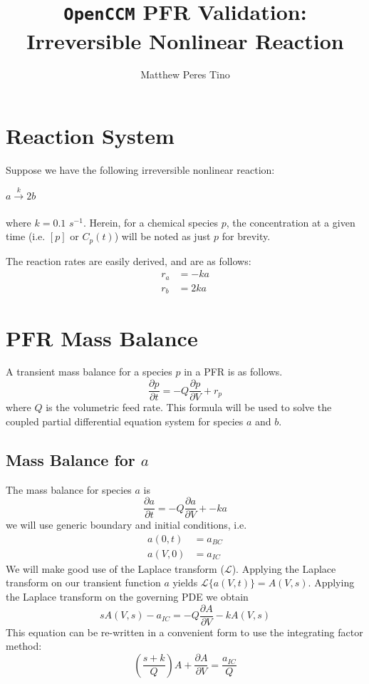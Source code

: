 \documentclass[a4paper,12pt]{article}
\begin{document}
\title{\texttt{OpenCCM} PFR Validation: Irreversible Nonlinear Reaction}
\author{Matthew Peres Tino}
\maketitle

\section{Reaction System}

Suppose we have the following irreversible nonlinear reaction:
\begin{center}
	$a\xrightarrow[]{k} 2b$
\end{center}
where $k = 0.1$ $s^{-1}$.
Herein, for a chemical species $p$, the concentration at a given time (i.e. $[p]$ or $C_p(t)$) will be noted as just $p$ for brevity.

The reaction rates are easily derived, and are as follows:
\begin{align}
    r_a &= -k a \\
    r_b &= 2 k a
\end{align}

\section{PFR Mass Balance}

A transient mass balance for a species $p$ in a PFR is as follows. 
\begin{equation}
	\frac{\partial p}{\partial t} = -Q\frac{\partial p}{\partial V} + r_p
\end{equation}
where $Q$ is the volumetric feed rate.
This formula will be used to solve the coupled partial differential equation system for species $a$ and $b$. 

\newpage 
\subsection{Mass Balance for $a$}

The mass balance for species $a$ is 
\begin{equation}
	\frac{\partial a}{\partial t} = -Q\frac{\partial a}{\partial V} + -ka
\end{equation}
we will use generic boundary and initial conditions, i.e.
\begin{align}
	a(0, t) &= a_{BC}\\
	a(V, 0) &= a_{IC} 
\end{align}
We will make good use of the Laplace transform ($\mathscr{L}$).
Applying the Laplace transform on our transient function $a$ yields $ \mathscr{L}\{a(V, t)\} = A(V, s) $.
Applying the Laplace transform on the governing PDE we obtain 
\begin{equation}
	sA(V,s) - a_{IC} = -Q\frac{\partial A}{\partial V} - kA(V,s)
\end{equation}
This equation can be re-written in a convenient form to use the integrating factor method:
\begin{equation}
	\left( \frac{s+k}{Q} \right) A + \frac{\partial A}{\partial V} = \frac{a_{IC}}{Q}
\end{equation}
\end{document}

